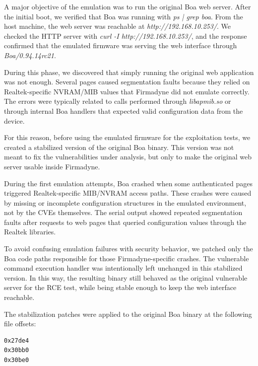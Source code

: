               A major objective of the emulation was to run the original Boa web server. After the initial boot, we verified that Boa was running with \emph{ps | grep boa}. From the host machine, the web server was
              reachable at \emph{http://192.168.10.253/}. We checked the HTTP server with \emph{curl -I http://192.168.10.253/}, and the response confirmed that the emulated firmware was serving the web interface
              through \emph{Boa/0.94.14rc21}.

              During this phase, we discovered that simply running the original web application was not enough. Several pages caused segmentation faults because they relied on Realtek-specific NVRAM/MIB values that
              Firmadyne did not emulate correctly. The errors were typically related to calls performed through \emph{libapmib.so} or through internal Boa handlers that expected valid configuration data from the
              device.

              For this reason, before using the emulated firmware for the exploitation tests, we created a stabilized version of the original Boa binary. This version was not meant to fix the vulnerabilities under
                analysis, but only to make the original web server usable inside Firmadyne.

                During the first emulation attempts, Boa crashed when some authenticated pages triggered Realtek-specific MIB/NVRAM access paths. These crashes were caused by missing or incomplete configuration
                structures in the emulated environment, not by the CVEs themselves. The serial output showed repeated segmentation faults after requests to web pages that queried configuration values through the Realtek
                libraries.

                To avoid confusing emulation failures with security behavior, we patched only the Boa code paths responsible for those Firmadyne-specific crashes. The vulnerable command execution handler was
                intentionally left unchanged in this stabilized version. In this way, the resulting binary still behaved as the original vulnerable server for the RCE test, while being stable enough to keep the web
                interface reachable.

                The stabilization patches were applied to the original Boa binary at the following file offsets:

\begin{lstlisting}[language=bash]
0x27de4
0x30bb0
0x30be0
\end{lstlisting}

